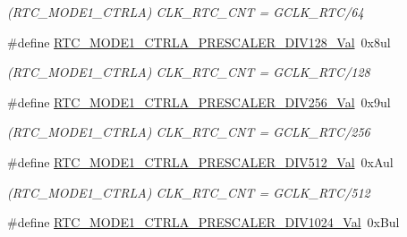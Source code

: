 \begin{DoxyCompactItemize}
\begin{DoxyCompactList}\small\item\em (R\+T\+C\+\_\+\+M\+O\+D\+E1\+\_\+\+C\+T\+R\+L\+A) C\+L\+K\+\_\+\+R\+T\+C\+\_\+\+C\+N\+T = G\+C\+L\+K\+\_\+\+R\+T\+C/64 \end{DoxyCompactList}\item 
\hypertarget{group___s_a_m_l21___r_t_c_gaae159b33f80652ba06508134a380b9f4}{}\#define \hyperlink{group___s_a_m_l21___r_t_c_gaae159b33f80652ba06508134a380b9f4}{R\+T\+C\+\_\+\+M\+O\+D\+E1\+\_\+\+C\+T\+R\+L\+A\+\_\+\+P\+R\+E\+S\+C\+A\+L\+E\+R\+\_\+\+D\+I\+V128\+\_\+\+Val}~0x8ul\label{group___s_a_m_l21___r_t_c_gaae159b33f80652ba06508134a380b9f4}

\begin{DoxyCompactList}\small\item\em (R\+T\+C\+\_\+\+M\+O\+D\+E1\+\_\+\+C\+T\+R\+L\+A) C\+L\+K\+\_\+\+R\+T\+C\+\_\+\+C\+N\+T = G\+C\+L\+K\+\_\+\+R\+T\+C/128 \end{DoxyCompactList}\item 
\hypertarget{group___s_a_m_l21___r_t_c_ga389748b139b1e5f773c5eb0af1876c07}{}\#define \hyperlink{group___s_a_m_l21___r_t_c_ga389748b139b1e5f773c5eb0af1876c07}{R\+T\+C\+\_\+\+M\+O\+D\+E1\+\_\+\+C\+T\+R\+L\+A\+\_\+\+P\+R\+E\+S\+C\+A\+L\+E\+R\+\_\+\+D\+I\+V256\+\_\+\+Val}~0x9ul\label{group___s_a_m_l21___r_t_c_ga389748b139b1e5f773c5eb0af1876c07}

\begin{DoxyCompactList}\small\item\em (R\+T\+C\+\_\+\+M\+O\+D\+E1\+\_\+\+C\+T\+R\+L\+A) C\+L\+K\+\_\+\+R\+T\+C\+\_\+\+C\+N\+T = G\+C\+L\+K\+\_\+\+R\+T\+C/256 \end{DoxyCompactList}\item 
\hypertarget{group___s_a_m_l21___r_t_c_ga840b427da171cb0886fda3cca6b8013a}{}\#define \hyperlink{group___s_a_m_l21___r_t_c_ga840b427da171cb0886fda3cca6b8013a}{R\+T\+C\+\_\+\+M\+O\+D\+E1\+\_\+\+C\+T\+R\+L\+A\+\_\+\+P\+R\+E\+S\+C\+A\+L\+E\+R\+\_\+\+D\+I\+V512\+\_\+\+Val}~0x\+Aul\label{group___s_a_m_l21___r_t_c_ga840b427da171cb0886fda3cca6b8013a}

\begin{DoxyCompactList}\small\item\em (R\+T\+C\+\_\+\+M\+O\+D\+E1\+\_\+\+C\+T\+R\+L\+A) C\+L\+K\+\_\+\+R\+T\+C\+\_\+\+C\+N\+T = G\+C\+L\+K\+\_\+\+R\+T\+C/512 \end{DoxyCompactList}\item 
\hypertarget{group___s_a_m_l21___r_t_c_ga1daecc499796a06540183d7a920c29eb}{}\#define \hyperlink{group___s_a_m_l21___r_t_c_ga1daecc499796a06540183d7a920c29eb}{R\+T\+C\+\_\+\+M\+O\+D\+E1\+\_\+\+C\+T\+R\+L\+A\+\_\+\+P\+R\+E\+S\+C\+A\+L\+E\+R\+\_\+\+D\+I\+V1024\+\_\+\+Val}~0x\+Bul\label{group___s_a_m_l21___r_t_c_ga1daecc499796a06540183d7a920c29eb}


\end{DoxyCompactItemize}
